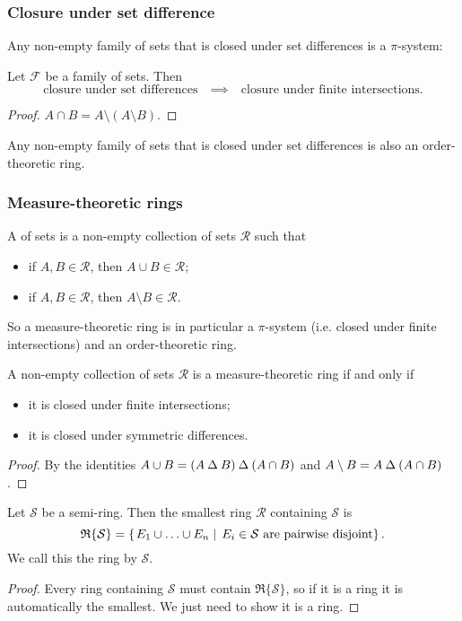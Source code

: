 \subsubsection{Closure under set difference}
Any non-empty family of sets that is closed under set differences is a $\pi$-system:
\begin{lemma}
Let $\mathcal{F}$ be a family of sets. Then
\[ \text{closure under set differences} \quad\implies\quad \text{closure under finite intersections.} \]
\end{lemma}
\begin{proof}
$A\cap B = A\setminus (A\setminus B)$.
\end{proof}

Any non-empty family of sets that is closed under set differences is also an order-theoretic ring.

\subsubsection{Measure-theoretic rings}
\begin{definition}
A  of sets is a non-empty collection of sets $\mathcal{R}$ such that
\begin{itemize}
\item if $A,B\in \mathcal{R}$, then $A\cup B\in \mathcal{R}$;
\item if $A,B\in \mathcal{R}$, then $A\setminus B\in \mathcal{R}$.
\end{itemize}
\end{definition}
So a measure-theoretic ring is in particular a $\pi$-system (i.e. closed under finite intersections) and an order-theoretic ring.

\begin{lemma}
A non-empty collection of sets $\mathcal{R}$ is a measure-theoretic ring \textup{if and only if}
\begin{itemize}
\item it is closed under finite intersections;
\item it is closed under symmetric differences.
\end{itemize}
\end{lemma}
\begin{proof}
By the identities $A\cup B = (A\mathbin{\Delta} B)\mathbin{\Delta} (A\cap B)$ and $A\setminus B = A\mathbin{\Delta} (A\cap B)$.
\end{proof}

\begin{lemma}
Let $\mathcal{S}$ be a semi-ring. Then the smallest ring $\mathcal{R}$ containing $\mathcal{S}$ is
\[ \mathfrak{R}\{\mathcal{S}\} = \left\{\left. E_1\cup\ldots\cup E_n \;\right|\; \text{$E_i\in \mathcal{S}$ are pairwise disjoint} \right\}. \]
We call this the ring  by $\mathcal{S}$.
\end{lemma}
\begin{proof}
Every ring containing $\mathcal{S}$ must contain $\mathfrak{R}\{\mathcal{S}\}$, so if it is a ring it is automatically the smallest. We just need to show it is a ring.
\end{proof}

